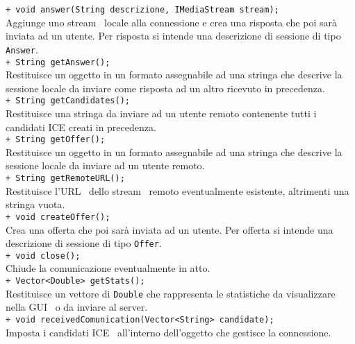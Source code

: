 {{\begin{sloppypar}
{{{\begin{itemize}
					\texttt{+ void answer(String descrizione, IMediaStream stream);}\\
					Aggiunge uno stream\g~ locale alla connessione e crea una risposta che poi sarà inviata ad un utente. Per risposta si intende una descrizione di sessione di tipo \texttt{Answer}.\\
					
					\texttt{+ String getAnswer();}\\
					Restituisce un oggetto in un formato assegnabile ad una stringa che descrive la sessione locale da inviare come risposta ad un altro ricevuto in precedenza.\\

					\texttt{+ String getCandidates();}\\
					Restituisce una stringa da inviare ad un utente remoto contenente tutti i candidati ICE creati in precedenza.\\

					\texttt{+ String getOffer();}\\
					Restituisce un oggetto in un formato assegnabile ad una stringa che descrive la sessione locale da inviare ad un utente remoto.\\

					\texttt{+ String getRemoteURL();}\\
					Restituisce l'URL\g~ dello stream\g~ remoto eventualmente esistente, altrimenti una stringa vuota.\\

					\texttt{+ void createOffer();}\\
					Crea una offerta che poi sarà inviata ad un utente. Per offerta si intende una descrizione di sessione di tipo \texttt{Offer}.\\

					\texttt{+ void close();}\\
					Chiude la comunicazione eventualmente in atto.\\

					\texttt{+ Vector<Double> getStats();}\\
					Restituisce un vettore di \texttt{Double} che rappresenta le statistiche da visualizzare nella GUI\g~ o da inviare al server\g.\\

					\texttt{+ void receivedComunication(Vector<String> candidate);}\\
					Imposta i candidati ICE\g~ all'interno dell'oggetto che gestisce la connessione.\\


\end{itemize}}}}
\end{sloppypar}}}
